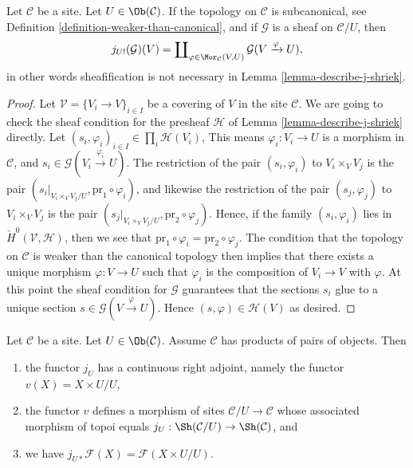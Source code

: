 \begin{lemma}
\label{lemma-describe-j-shriek-good-site}
Let $\mathcal{C}$ be a site.
Let $U \in \Ob(\mathcal{C})$.
If the topology on $\mathcal{C}$ is subcanonical, see
Definition \ref{definition-weaker-than-canonical},
and if $\mathcal{G}$ is a sheaf on $\mathcal{C}/U$, then
$$
j_{U!}(\mathcal{G})(V)
=
\coprod\nolimits_{\varphi \in \Mor_\mathcal{C}(V, U)}
\mathcal{G}(V \xrightarrow{\varphi} U),
$$
in other words sheafification is not necessary in
Lemma \ref{lemma-describe-j-shriek}.
\end{lemma}

\begin{proof}
Let $\mathcal{V} = \{V_i \to V\}_{i \in I}$ be a covering of $V$
in the site $\mathcal{C}$.
We are going to check the sheaf condition for the presheaf $\mathcal{H}$
of Lemma \ref{lemma-describe-j-shriek} directly.
Let $(s_i, \varphi_i)_{i \in I} \in \prod_i \mathcal{H}(V_i)$,
This means $\varphi_i : V_i \to U$ is a morphism in $\mathcal{C}$, and
$s_i \in \mathcal{G}(V_i \xrightarrow{\varphi_i} U)$.
The restriction of the pair $(s_i, \varphi_i)$ to
$V_i \times_V V_j$ is the pair
$(s_i|_{V_i \times_V V_j/U}, \text{pr}_1 \circ \varphi_i)$, and
likewise the restriction of the pair $(s_j, \varphi_j)$ to
$V_i \times_V V_j$ is the pair
$(s_j|_{V_i \times_V V_j/U}, \text{pr}_2 \circ \varphi_j)$.
Hence, if the family $(s_i, \varphi_i)$ lies in
$\check{H}^0(\mathcal{V}, \mathcal{H})$, then we see that
$\text{pr}_1 \circ \varphi_i = \text{pr}_2 \circ \varphi_j$.
The condition that the topology on $\mathcal{C}$ is weaker than the canonical
topology then implies that there exists a unique morphism
$\varphi : V \to U$ such that $\varphi_i$ is the composition
of $V_i \to V$ with $\varphi$. At this point the sheaf condition for
$\mathcal{G}$ guarantees that the sections $s_i$ glue to a unique
section $s \in \mathcal{G}(V \xrightarrow{\varphi} U)$.
Hence $(s, \varphi) \in \mathcal{H}(V)$ as desired.
\end{proof}

\begin{lemma}
\label{lemma-localize-given-products}
Let $\mathcal{C}$ be a site.
Let $U \in \Ob(\mathcal{C})$.
Assume $\mathcal{C}$ has products of pairs of objects.
Then
\begin{enumerate}
\item the functor $j_U$ has a continuous right adjoint,
namely the functor $v(X) = X \times U / U$,
\item the functor $v$ defines a morphism of sites
$\mathcal{C}/U \to \mathcal{C}$ whose associated morphism of topoi equals
$j_U : \Sh(\mathcal{C}/U) \to \Sh(\mathcal{C})$, and
\item we have $j_{U*}\mathcal{F}(X) = \mathcal{F}(X \times U/U)$.
\end{enumerate}
\end{lemma}

